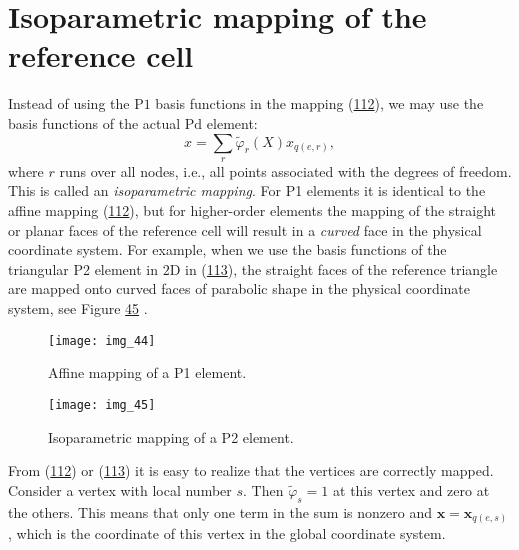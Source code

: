 \documentclass[../main.tex]{subfiles}
\begin{document}
	\section[Isoparametric mapping of the reference cell]{Isoparametric mapping of the reference cell}
	\label{sec:sec_9_4}
	Instead of using the $\mathrm{P} 1$ basis functions in the mapping (\hyperref[eqa112]{112}), we may use the basis functions of the actual $\mathrm{Pd}$ element:
	\begin{equation}\label{eqa113}
		x=\sum_{r} \tilde{\varphi}_{r}(X) x_{q(e, r)},
	\end{equation}
	where $r$ runs over all nodes, i.e., all points associated with the degrees of freedom. This is called an \textit{isoparametric mapping}. For P1 elements it is identical to the affine mapping (\hyperref[eqa112]{112}), but for higher-order elements the mapping of the straight or planar faces of the reference cell will result in a \textit{curved} face in the physical coordinate system. For example, when we use the basis functions of the triangular P2 element in $2 \mathrm{D}$ in (\hyperref[eqa113]{113}), the straight faces of the reference triangle are mapped onto curved faces of parabolic shape in the physical coordinate system, see Figure \hyperref[fig:img_45]{45} .
	\begin{figure}[H]
		\centering
		\texttt{[image: img\_44]}
		\caption{Affine mapping of a P1 element.}
		\label{fig:img_44}
	\end{figure}
	\begin{figure}[H]
		\centering
		\texttt{[image: img\_45]}
		\caption{Isoparametric mapping of a P2 element.}
		\label{fig:img_45}
	\end{figure}
	
	From (\hyperref[eqa112]{112}) or (\hyperref[eqa113]{113}) it is easy to realize that the vertices are correctly mapped. Consider a vertex with local number $s$. Then $\tilde{\varphi}_{s}=1$ at this vertex and zero at the others. This means that only one term in the sum is nonzero and $\boldsymbol{x}=\boldsymbol{x}_{q(e, s)}$, which is the coordinate of this vertex in the global coordinate system.
\end{document}
